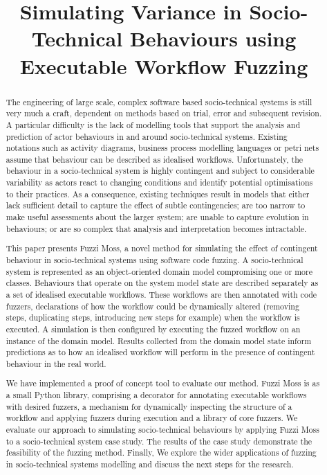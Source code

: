 \documentclass{sig-alternate}
\title{Simulating Variance in Socio-Technical Behaviours using Executable Workflow Fuzzing}
\begin{document}

\maketitle


\begin{abstract}
  The engineering of large scale, complex software based socio-technical systems
  is still very much a craft, dependent on methods based on trial, error and
  subsequent revision.  A particular difficulty is the lack of modelling tools
  that support the analysis and prediction of actor behaviours in and around
  socio-technical systems.  Existing notations such as activity diagrams,
  business process modelling languages or petri nets assume that behaviour can
  be described as idealised workflows.  Unfortunately, the behaviour in a
  socio-technical system is highly contingent and subject to considerable
  variability as actors react to changing conditions and identify potential
  optimisations to their practices.  As a consequence, existing techniques
  result in models that either lack sufficient detail to capture the effect of
  subtle contingencies; are too narrow to make useful assessments about the
  larger system; are unable to capture evolution in behaviours; or are so
  complex that analysis and interpretation becomes intractable.

  This paper presents Fuzzi Moss, a novel method for simulating the effect of
  contingent behaviour in socio-technical systems using software code fuzzing.
  A socio-technical system is represented as an object-oriented domain model
  compromising one or more classes.  Behaviours that operate on the system model
  state are described separately as a set of idealised executable workflows.
  These workflows are then annotated with code fuzzers, declarations of how the
  workflow could be dynamically altered (removing steps, duplicating steps,
  introducing new steps for example) when the workflow is executed.  A
  simulation is then configured by executing the fuzzed workflow on an instance
  of the domain model.  Results collected from the domain model state inform
  predictions as to how an idealised workflow will perform in the presence of
  contingent behaviour in the real world.
 
  We have implemented a proof of concept tool to evaluate our method. Fuzzi Moss
  is as a small Python library, comprising a decorator for annotating executable
  workflows with desired fuzzers, a mechanism for dynamically inspecting the
  structure of a workflow and applying fuzzers during execution and a library of
  core fuzzers.  We evaluate our approach to simulating socio-technical
  behaviours by applying Fuzzi Moss to a socio-technical system case study.  The
  results of the case study demonstrate the feasibility of the fuzzing method.
  Finally, We explore the wider applications of fuzzing in socio-technical
  systems modelling and discuss the next steps for the research.
\end{abstract}
\end{document}
